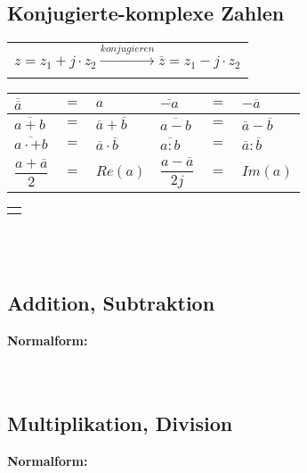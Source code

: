 		\renewcommand{\arraystretch}{1}
	\begin{minipage}[t]{0.5\textwidth}
		\subsection{Konjugierte-komplexe Zahlen}
			\begin{tabular}{c}
				$z = z_{1} + j \cdot z_{2} \xrightarrow[]{konjugieren} \overline{z} = z_{1} - j \cdot z_{2}$\\[3pt]
			\end{tabular}
			\renewcommand{\arraystretch}{1.7}
				\begin{tabular}{|lcl|lcl|}
					\hline
					$\overline{\overline{a}}$ & $=$ & $a$ & $\overline{-a}$ & $=$ & $-\overline{a}$\\
					\hline
					$\overline{a + b}$ & $=$ & $\overline{a} + \overline{b}$ & $\overline{a - b}$ & $=$ & $\overline{a} - \overline{b}$\\
					\hline
					$\overline{a \cdot+ b}$ & $=$ & $\overline{a} \cdot \overline{b}$ & $\overline{a : b}$ & $=$ & $\overline{a} : \overline{b}$\\
					\hline
					$\dfrac{a + \overline{a}}{2}$ & $=$ & $ Re(a)$ & $\dfrac{a - \overline{a}}{2j}$ & $=$ & $Im(a)$\\
					\hline
				\end{tabular}
			\renewcommand{\arraystretch}{1}
			\begin{tabular}{c}
				\scalebox{1}{}\\[3pt]
			\end{tabular}\\[3pt]
			\\[3pt]
	\end{minipage}
	\begin{minipage}[t]{0.5\textwidth}
		\subsection{Addition, Subtraktion}
			\textbf{Normalform:}\\[3pt]
			\\[3pt]
			\\[3pt]
		\subsection{Multiplikation, Division}
			\textbf{Normalform:}\\[3pt]
			\\[3pt]
			\\[3pt]
			\scalebox{1}{}\\[3pt]
	\end{minipage}
	
